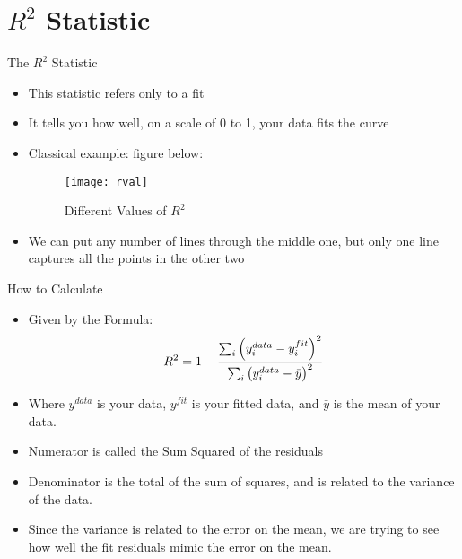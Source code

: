 \documentclass{beamer}
\begin{document}
\section{$R^2$ Statistic}
\begin{frame}{The $R^2$ Statistic}
  \begin{itemize}
  \item This statistic refers only to a fit
  \item It tells you how well, on a scale of 0 to 1, your data fits the curve
  \item Classical example: figure below:
    \begin{figure}[H]
      \centering
      \texttt{[image: rval]}
      \caption{Different Values of $R^2$}
    \end{figure}
  \item We can put any number of lines through the middle one, but only one line captures all the points in the other two
  \end{itemize}
\end{frame}

\begin{frame}{How to Calculate}
  \begin{itemize}
  \item Given by the Formula:
    \begin{align*}
      R^2=1-\frac{\sum_i\qty(y^{data}_i-y^{fit}_i)^2}
      {\sum_i\qty(y^{data}_i-\bar{y})^2}
    \end{align*}
  \item Where $y^{data}$ is your data, $y^{fit}$ is your fitted data, and $\bar{y}$ is the mean of your data.
  \item Numerator is called the Sum Squared of the residuals
  \item Denominator is the total of the sum of squares, and is related to the variance of the data.
  \item Since the variance is related to the error on the mean, we are trying to see how well the fit residuals mimic the error on the mean.
  \end{itemize}
\end{frame}
\end{document}
